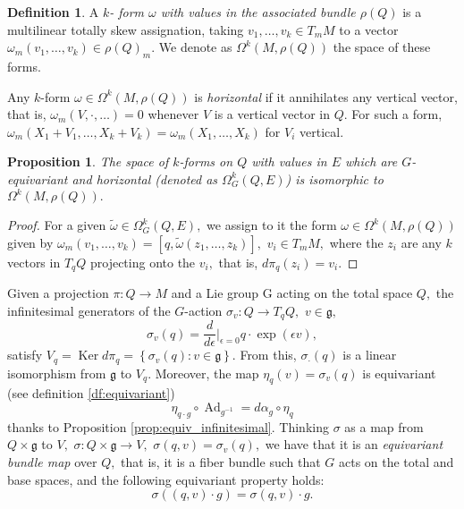 \documentclass[12pt, letterpaper, reqno]{amsart}
\theoremstyle{definition}
\newtheorem{df}{Definition}
\theoremstyle{plain}
\newtheorem{prop}{Proposition}
\theoremstyle{remark}
\begin{document}
\begin{df}
	A \textit{$ k $- form $ \omega $ with values in the associated bundle $ \rho(Q) $} is a multilinear totally skew assignation, taking $ v_1,\dots, v_k\in T_mM $ to a vector $ \omega_m(v_1,\dots,v_k)\in \rho(Q)_m. $  We denote as $ \Omega^k(M, \rho(Q)) $ the space of these forms.
\end{df}

Any $ k $-form $ \omega\in \Omega^k(M,\rho(Q)) $ is \textit{horizontal} if it annihilates any vertical vector, that is, $ \omega_m(V,\cdot,\dots)=0 $ whenever $ V $ is a vertical vector in $ Q. $ For such a form, $ \omega_m(X_1+V_1,\dots,X_k+V_k)=\omega_m(X_1,\dots, X_k) $ for $ V_i $ vertical.

\begin{prop}
	The space of $ k $-forms on $ Q $ with values in $ E $ which are $ G $-equivariant and horizontal (denoted as $ \Omega^k_G(Q,E) $) is isomorphic to $ \Omega^k(M,\rho(Q)). $ 
\end{prop}
\begin{proof}
	For a given $ \tilde \omega\in\Omega^k_G(Q,E), $ we assign to it the form $ \omega\in\Omega^k(M, \rho(Q)) $ given by $ \omega_m(v_1,\dots,v_k) = [q,\tilde\omega(z_1,\dots,z_k)],  $  $v_i\in T_mM, $ where the $ z_i $ are any $ k $ vectors in $ T_qQ $ projecting onto the $ v_i, $ that is, $ d\pi_q(z_i)=v_i. $  
\end{proof}

Given a projection $ \pi: Q \rightarrow M $ and a Lie group G acting on the total space $ Q, $ the infinitesimal generators of the $ G $-action $ \sigma_v: Q \rightarrow T_qQ, $ $ v\in \mathfrak{g,} $ 
$$ \sigma_v(q) = \frac{d}{d\epsilon} \Big|_{\epsilon=0} q\cdot \operatorname{exp} (\epsilon v),$$
satisfy $ V_q = \operatorname{Ker}d\pi_q = \left\{ \sigma_v(q): v\in \mathfrak{g} \right\} .  $ From this, $ \sigma_\cdot(q) $ is a linear isomorphism from $ \mathfrak{g} $ to $ V_q. $ Moreover, the map $ \eta_q(v)  = \sigma_v(q) $ is equivariant (see definition \ref{df:equivariant})
$$ \eta_{q\cdot g}\circ \operatorname{Ad}_{g^{-1}} = d\alpha_g  \circ \eta_q $$ 
thanks to Proposition \ref{prop:equiv_infinitesimal}. Thinking $ \sigma $ as a map from $ Q\times \mathfrak{g} $ to $ V, $ $ \sigma:Q\times \mathfrak{g}\rightarrow V, $ $ \sigma(q,v)= \sigma_v(q), $ we have that it is an \textit{equivariant bundle map} over $ Q, $ that is, it is a fiber bundle such that $ G $ acts on the total and base spaces, and the following equivariant property holds:
$$ \sigma \left( (q,v)\cdot g \right) = \sigma(q,v) \cdot g. $$ 
\end{document}

